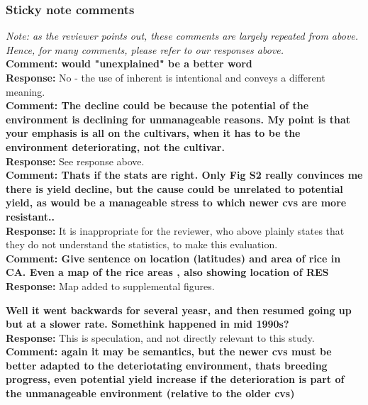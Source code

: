 \documentclass{article} \usepackage[margin=1in]{geometry}
\begin{document}
\subsubsection{Sticky note comments}

\textit{Note: as the reviewer points out, these comments are largely
  repeated from above. Hence, for many comments, please refer to our
  responses above.}\\

\textbf{Comment: would "unexplained" be a better word}\\

\textbf{Response:} No - the use of inherent is intentional and conveys
a different meaning.\\

\textbf{Comment: The decline could be because the potential of the
  environment is declining for unmanageable reasons. My point is that
  your emphasis is all on the cultivars, when it has to be the
  environment deteriorating, not the cultivar. }\\

\textbf{Response: } See response above.\\

\textbf{Comment: Thats if the stats are right. Only Fig S2 really
  convinces me there is yield decline, but the cause could be
  unrelated to potential yield, as would be a manageable stress to
  which newer cvs are more resistant..}\\

\textbf{Response: } It is inappropriate for the reviewer, who above
plainly states that they do not understand the statistics, to make
this evaluation.\\

\textbf{Comment: Give sentence on location (latitudes) and area of
  rice in CA. Even a map of the rice areas , also showing location of
  RES}\\

\textbf{Response: } Map added to supplemental figures.

\textbf{Well it went backwards for several yeasr, and then resumed
  going up but at a slower rate. Somethink happened in mid 1990s?}\\

\textbf{Response: } This is speculation, and not directly relevant to
this study.\\

\textbf{Comment: again it may be semantics, but the newer cvs must be
  better adapted to the deteriotating environment, thats breeding
  progress, even potential yield increase if the deterioration is part
  of the unmanageable environment (relative to the older cvs)}\\
\end{document}
